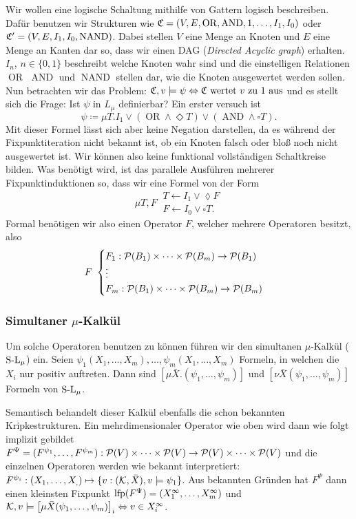 Wir wollen eine logische Schaltung mithilfe von Gattern logisch beschreiben. Dafür benutzen wir Strukturen wie $\mathfrak{C}=(V,E,\operatorname{OR},\operatorname{AND},1,\dots,I_1,I_0)$ oder $\mathfrak{C}'=(V,E,I_1,I_0,\operatorname{NAND})$. Dabei stellen $V$ eine Menge an Knoten und $E$ eine Menge an Kanten dar so, dass wir einen DAG (\textit{Directed Acyclic graph}) erhalten. $I_n$, $n\in\{0,1\}$ beschreibt welche Knoten \glqq wahr\grqq{} sind und die einstelligen Relationen $\operatorname{OR}$ $\operatorname{AND}$ und $\operatorname{NAND}$ stellen dar, wie die Knoten ausgewertet werden sollen.
Nun betrachten wir das Problem: $\mathfrak{C},v\models \psi \Leftrightarrow \mathfrak{C} \text{ wertet } v \text{ zu } 1 \text{ aus}$ und es stellt sich die Frage: Ist $\psi$ in $L_\mu$ definierbar? Ein erster versuch ist 
\[\psi\coloneqq \mu T . I_1 \lor (\operatorname{OR} \land \Diamond T) \lor (\operatorname{AND} \land \square T).\]
Mit dieser Formel lässt sich aber keine Negation darstellen, da es während der Fixpunktiteration nicht bekannt ist, ob ein Knoten \glqq falsch\grqq{} oder bloß noch nicht ausgewertet ist. Wir können also keine funktional vollständigen Schaltkreise bilden. Was benötigt wird, ist das parallele Ausführen mehrerer Fixpunktinduktionen so, dass wir eine Formel von der Form
\[\mu T, F\
\begin{array}{l}
	T \leftarrow I_1 \lor \lozenge F \\
	F \leftarrow I_0 \lor \square T.
\end{array}\]
Formal benötigen wir also einen Operator $F$, welcher mehrere Operatoren besitzt, also 
\[
F\
\begin{cases}
	F_1 : \mathcal{P}(B_1) \times \dots \times \mathcal{P}(B_m) \to \mathcal{P}(B_1)\\
	\vdots\\
	F_m : \mathcal{P}(B_1) \times \dots \times \mathcal{P}(B_m) \to \mathcal{P}(B_m)
\end{cases}
\]

\subsubsection*{Simultaner $\mu$-Kalkül}

Um solche Operatoren benutzen zu können führen wir den simultanen $\mu$-Kalkül ($\operatorname{S-L}_\mu$) ein. Seien $\psi_1(X_1,\dots,X_m),\dots,\psi_m(X_1,\dots,X_m)$ Formeln, in welchen die $X_i$ nur positiv auftreten. Dann sind $\left[\mu \bar{X}.(\psi_1,\dots,\psi_m)\right]$ und $\left[\nu \bar{X}(\psi_1,\dots,\psi_m)\right]$ Formeln von $\operatorname{S-L}_\mu$.

Semantisch behandelt dieser Kalkül ebenfalls die schon bekannten Kripkestrukturen. Ein mehrdimensionaler Operator wie oben wird dann wie folgt implizit gebildet $F^\Psi=(F^{\psi_1},\dots,F^{\psi_m}) : \mathcal{P}(V)\times \dots \times\mathcal{P}(V) \to \mathcal{P}(V)\times \dots \times \mathcal{P}(V)$ und die einzelnen Operatoren werden wie bekannt interpretiert: $F^{\psi_i} : (X_1,\dots,X_,)\mapsto\{v : (\mathcal{K},\bar{X}),v\models \psi_1\}$.
Aus bekannten Gründen hat $F^{\Psi}$ dann einen kleinsten Fixpunkt $\operatorname{lfp}(F^{\Psi})=(X_1^{\infty},\dots,X_m^\infty)$ und $\mathcal{K},v\models \left[\mu \bar{X}(\psi_1,\dots,\psi_m)\right]_i \Leftrightarrow v\in X_i^\infty$.

